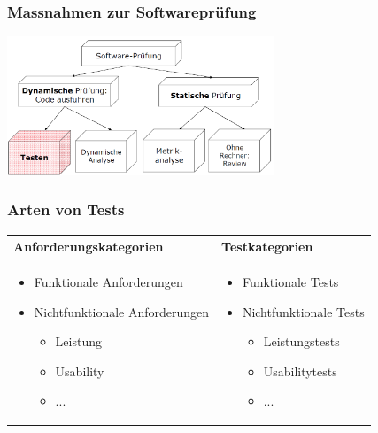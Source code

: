 \begin{multicols}{2}
	\subsubsection{Massnahmen zur Softwareprüfung}
\includegraphics[width = 8cm]{images/massnahmenSoftwarepruefung}
	
	\subsubsection{Arten von Tests}
	\begin{minipage}{10cm}
\begin{tabular}{|p{5cm}|p{4cm}|}
	\hline
	\textbf{Anforderungskategorien} & \textbf{Testkategorien} \\ \hline
	\begin{itemize}
		\item Funktionale Anforderungen
		\item Nichtfunktionale Anforderungen
		\begin{itemize}
			\item Leistung
			\item Usability
			\item ...
		\end{itemize}
		\end{itemize} & 
		\begin{itemize}
		\item Funktionale Tests
		\item Nichtfunktionale Tests
		\begin{itemize}
			\item Leistungstests
			\item Usabilitytests
			\item ...	
		\end{itemize}
	\end{itemize} \\ \hline
\end{tabular}
\end{minipage}
\end{multicols}

